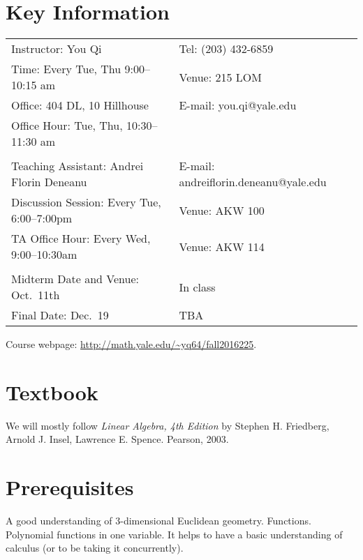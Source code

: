 \documentclass[margin,line]{res}
\begin{document}

\begin{resume}

\section{\sc Key Information}
\vspace{.05in}
\begin{tabular}{@{}p{3.4in}p{4in}}
 Instructor: You Qi            & Tel: (203) 432-6859   \\
Time: Every Tue, Thu 9:00--10:15 am & Venue: 215 LOM\\
Office: 404 DL, 10 Hillhouse   & E-mail:  you.qi@yale.edu \\
Office Hour: Tue, Thu, 10:30--11:30 am &\\
& \\
Teaching Assistant: Andrei Florin Deneanu & E-mail: andreiflorin.deneanu@yale.edu\\
Discussion Session: Every Tue, 6:00--7:00pm & Venue: AKW 100\\
TA Office Hour: Every Wed, 9:00--10:30am  & Venue: AKW 114 \\
& \\
Midterm Date and Venue: Oct.~11th & In class\\
Final Date: Dec.~19 & TBA
\end{tabular}
Course webpage: \url{http://math.yale.edu/~yq64/fall2016225}.

\section{\sc Textbook}
We will mostly follow \emph{Linear Algebra, 4th Edition}
by Stephen H. Friedberg, Arnold J. Insel, Lawrence E. Spence. Pearson, 2003.

\section{\sc Prerequisites}
A good understanding of 3-dimensional Euclidean geometry. Functions. Polynomial functions in one variable. It helps to have a basic understanding of calculus (or to be taking it concurrently).



\end{resume}
\end{document}

